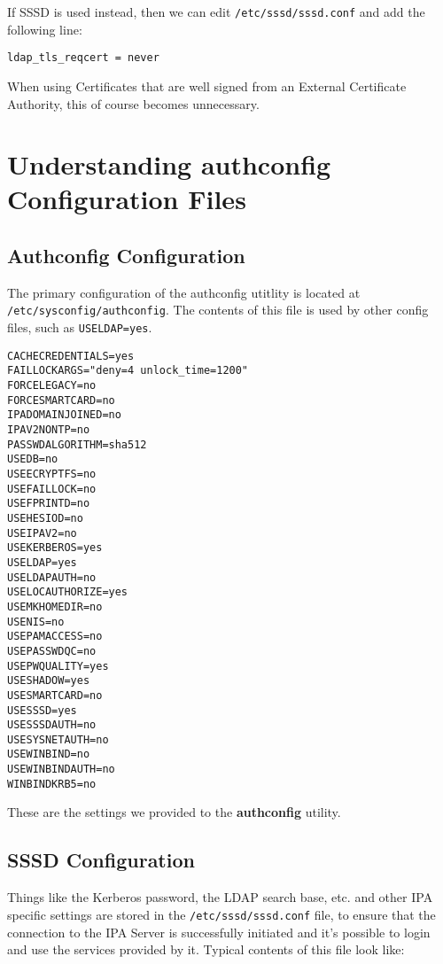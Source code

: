 \noindent
If SSSD is used instead, then we can edit \verb|/etc/sssd/sssd.conf| and add the following line:

\vspace{-15pt}
\begin{verbatim}
ldap_tls_reqcert = never
\end{verbatim}
\vspace{-10pt}

\noindent
When using Certificates that are well signed from an External Certificate Authority, this of course becomes unnecessary. 

\section{Understanding authconfig Configuration Files}
\subsection{Authconfig Configuration}
The primary configuration of the authconfig utitlity is located at \verb|/etc/sysconfig/authconfig|. The contents of this file is used by other config files, such as \verb|USELDAP=yes|. 

\vspace{-15pt}
\begin{verbatim}
CACHECREDENTIALS=yes
FAILLOCKARGS="deny=4 unlock_time=1200"
FORCELEGACY=no
FORCESMARTCARD=no
IPADOMAINJOINED=no
IPAV2NONTP=no
PASSWDALGORITHM=sha512
USEDB=no
USEECRYPTFS=no
USEFAILLOCK=no
USEFPRINTD=no
USEHESIOD=no
USEIPAV2=no
USEKERBEROS=yes
USELDAP=yes
USELDAPAUTH=no
USELOCAUTHORIZE=yes
USEMKHOMEDIR=no
USENIS=no
USEPAMACCESS=no
USEPASSWDQC=no
USEPWQUALITY=yes
USESHADOW=yes
USESMARTCARD=no
USESSSD=yes
USESSSDAUTH=no
USESYSNETAUTH=no
USEWINBIND=no
USEWINBINDAUTH=no
WINBINDKRB5=no
\end{verbatim}
\vspace{-10pt}

\noindent
These are the settings we provided to the \textbf{authconfig} utility.

\subsection{SSSD Configuration}
Things like the Kerberos password, the LDAP search base, etc. and other IPA specific settings are stored in the \verb|/etc/sssd/sssd.conf| file, to ensure that the connection to the IPA Server is successfully initiated and it's possible to login and use the services provided by it. Typical contents of this file look like:


